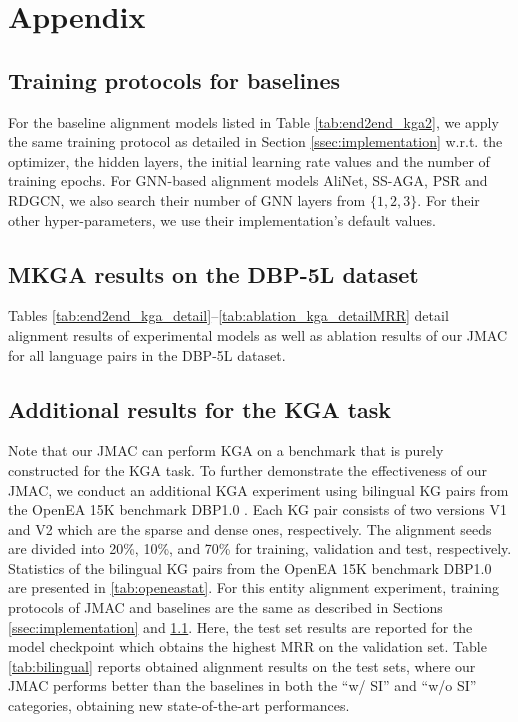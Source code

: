 \documentclass[11pt]{article}
\begin{document}
\appendix 

\section{Appendix}
\label{sec:appendix}


\subsection{Training protocols for baselines}\label{ssec:implementationbl}
For the baseline alignment models listed in Table \ref{tab:end2end_kga2}, we apply the same training protocol as detailed in Section \ref{ssec:implementation} w.r.t. the optimizer, the hidden layers, the initial learning rate values and the number of training epochs. For GNN-based alignment models {AliNet}, {SS-AGA}, PSR and {RDGCN}, we also search their number of GNN layers from $\{1, 2, 3\}$. For their other hyper-parameters, we use their implementation's default values. 


\subsection{MKGA results on the DBP-5L dataset}  
Tables \ref{tab:end2end_kga_detail}--\ref{tab:ablation_kga_detailMRR} detail alignment results of experimental models as well as ablation  results of our JMAC for all language pairs in the DBP-5L dataset.


\subsection{Additional results for the KGA task} 
Note that our JMAC can perform KGA on a benchmark that is purely constructed for the KGA task. To further demonstrate the effectiveness of our JMAC, we conduct an additional KGA experiment using bilingual KG pairs from the OpenEA 15K benchmark DBP1.0 \cite{sun2020benchmarking}.  
Each KG pair consists of two versions V1 and V2 which are the sparse and dense ones, respectively. The alignment seeds are divided into 20\%, 10\%, and 70\% for training, validation and test, respectively. Statistics of the bilingual KG pairs from the OpenEA 15K benchmark DBP1.0 are presented in \autoref{tab:openeastat}.  For this entity alignment experiment, training protocols of JMAC and baselines are the same as described in Sections \ref{ssec:implementation} and \ref{ssec:implementationbl}. Here, the test set results are reported for the model checkpoint which obtains the highest MRR on the validation set. Table \ref{tab:bilingual} reports obtained alignment results on the test sets, where our JMAC performs better than the baselines in both the ``w/ SI'' and ``w/o SI'' categories, obtaining new state-of-the-art performances.   
\end{document}
